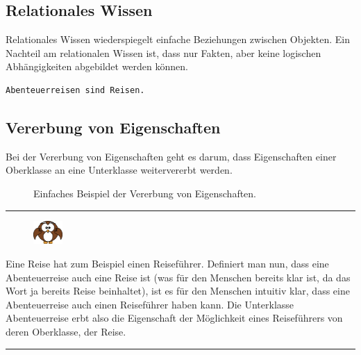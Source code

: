 \subsection{Relationales Wissen}
\label{subsec:relationales_wissen}
Relationales Wissen wiederspiegelt einfache Beziehungen zwischen Objekten. Ein Nachteil am relationalen Wissen ist, dass nur Fakten, aber keine logischen Abhängigkeiten abgebildet werden können.

\begin{lstlisting}[caption={Einfaches Beispiel von relationalem Wissen.}]
     Abenteuerreisen sind Reisen.
\end{lstlisting}

\newpage

\subsection{Vererbung von Eigenschaften}
\label{subsec:vererbung_eigenschaft}
Bei der Vererbung von Eigenschaften geht es darum, dass Eigenschaften einer Oberklasse an eine Unterklasse weitervererbt werden.

\begin{figure}[htbp]
\centering {}
\caption{Einfaches Beispiel der Vererbung von Eigenschaften.\label{fig:experten_systeme_vererbung}\protect\footnotemark}
\end{figure}


\noindent\rule[1ex]{\textwidth}{1pt}
\begin{figure}
    \vspace{-14pt}
    \includegraphics[width=0.1\textwidth]{bilder/owl.png}
\end{figure}
Eine Reise hat zum Beispiel einen Reiseführer. Definiert man nun, dass eine Abenteuerreise auch eine Reise ist (was für den Menschen bereits klar ist, da das Wort ja bereits Reise beinhaltet), ist es für den Menschen intuitiv klar, dass eine Abenteuerreise auch einen Reiseführer haben kann. Die Unterklasse Abenteuerreise erbt also die Eigenschaft der Möglichkeit eines Reiseführers von deren Oberklasse, der Reise.\\
\noindent\rule[1ex]{\textwidth}{1pt}

